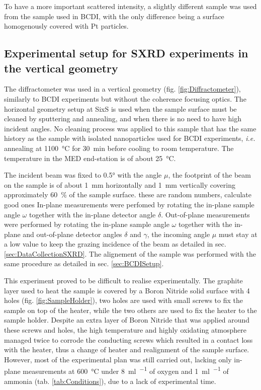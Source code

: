 To have a more important scattered intensity, a slightly different sample was used from the sample used in BCDI, with the only difference being a surface homogenously covered with Pt particles.

\subsection{Experimental setup for SXRD experiments in the vertical geometry}\label{sec:SXRDSetupV}

The diffractometer was used in a vertical geometry (fig. \ref{fig:Diffractometer}), similarly to BCDI experiments but without the coherence focusing optics.
The horizontal geometry setup at SixS is used when the sample surface must be cleaned by sputtering and annealing, and when there is no need to have high incident angles.
No cleaning process was applied to this sample that has the same history as the sample with isolated nanoparticles used for BCDI experiments, \textit{i.e.} annealing at \qty{1100}{\degreeCelsius} for \qty{30}{\minute} before cooling to room temperature.
The temperature in the MED end-station is of about \qty{25}{\degreeCelsius}.

The incident beam was fixed to \ang{0.5} with the angle $\mu$, the footprint of the beam on the sample is of about \qty{1}{\mm} horizontally and \qty{1}{\mm} vertically covering approximately \qty{60}{\percent} of the sample surface.
\textcolor{Important}{these are random numbers, calculate good ones}
In-plane measurements were perfomed by rotating the in-plane sample angle $\omega$ together with the in-plane detector angle $\delta$.
Out-of-plane measurements were performed by rotating the in-plane sample angle $\omega$ together with the in-plane and out-of-plane detector angles $\delta$ and $\gamma$, the incoming angle $\mu$ must stay at a low value to keep the grazing incidence of the beam as detailed in sec. \ref{sec:DataCollectionSXRD}.
The alignement of the sample was performed with the same procedure as detailed in sec. \ref{sec:BCDISetup}.

This experiment proved to be difficult to realise experimentally.
The graphite layer used to heat the sample is covered by a Boron Nitride solid surface with 4 holes (fig. \ref{fig:SampleHolder}), two holes are used with small screws to fix the sample on top of the heater, while the two others are used to fix the heater to the sample holder.
Despite an extra layer of Boron Nitride that was applied around these screws and holes, the high temperature and highly oxidating atmosphere managed twice to corrode the conducting screws which resulted in a contact loss with the heater, thus a change of heater and realignment of the sample surface.
However, most of the experimental plan was still carried out, lacking only in-plane measurements at \qty{600}{\degreeCelsius} under \qty{8}{\ml\per\min} of oxygen and \qty{1}{\ml\per\min} of ammonia (tab. \ref{tab:Conditions}), due to a lack of experimental time.

